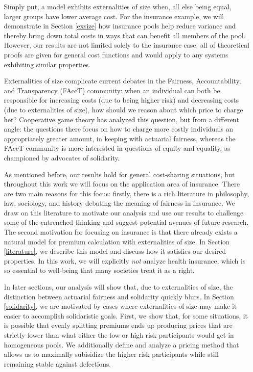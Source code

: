 \documentclass[sigconf]{acmart}
\begin{document}
Simply put, a model exhibits externalities of size when, all else being equal, larger groups have lower average cost. For the insurance example, we will demonstrate in Section \ref{exsize} how insurance pools help reduce variance and thereby bring down total costs in ways that can benefit all members of the pool. However, our results are not limited solely to the insurance case: all of theoretical proofs are given for general cost functions and would apply to any systems exhibiting similar properties.

Externalities of size complicate current debates in the Fairness, Accountability, and Transparency (FAccT) community: when an individual can both be responsible for increasing costs (due to being higher risk) and decreasing costs (due to externalities of size), how should we reason about which price to charge her? Cooperative game theory has analyzed this question, but from a different angle: the questions there focus on how to charge more costly individuals an appropriately greater amount, in keeping with actuarial fairness, whereas the FAccT community is more interested in questions of equity and equality, as championed by advocates of solidarity. 

As mentioned before, our results hold for general cost-sharing situations, but throughout this work we will focus on the application area of insurance. There are two main reasons for this focus: firstly, there is a rich literature in philosophy, law, sociology, and history debating the meaning of fairness in insurance. We draw on this literature to motivate our analysis and use our results to challenge some of the entrenched thinking and suggest potential avenues of future research. The second motivation for focusing on insurance is that there already exists a natural model for premium calculation with externalities of size. In Section \ref{literature}, we describe this model and discuss how it satisfies our desired properties. In this work, we will explicitly \emph{not} analyze health insurance, which is so essential to well-being that many societies treat it as a right.

In later sections, our analysis will show that, due to externalities of size, the distinction between actuarial fairness and solidarity quickly blurs. In Section \ref{solidarity}, we are motivated by cases where externalities of size may make it easier to accomplish solidaristic goals. First, we show that, for some situations, it is possible that evenly splitting premiums ends up producing prices that are strictly lower than what either the low or high risk participants would get in homogeneous pools. We additionally define and analyze a pricing method that allows us to maximally subisidize the higher risk participants while still remaining stable against defections. 
\end{document}
